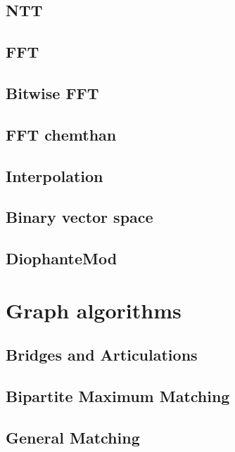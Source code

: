 \subsection{NTT}
\raggedbottom
\hrulefill
\subsection{FFT}
\raggedbottom
\hrulefill
\subsection{Bitwise FFT}
\raggedbottom
\hrulefill
\subsection{FFT chemthan}
\raggedbottom
\hrulefill
\subsection{Interpolation}
\raggedbottom
\hrulefill
\subsection{Binary vector space}
\raggedbottom
\hrulefill
\subsection{DiophanteMod}
\raggedbottom
\hrulefill

\section{Graph algorithms}
\subsection{Bridges and Articulations}
\raggedbottom
\hrulefill
\subsection{Bipartite Maximum Matching}
\raggedbottom
\hrulefill
\subsection{General Matching}
\raggedbottom
\hrulefill

